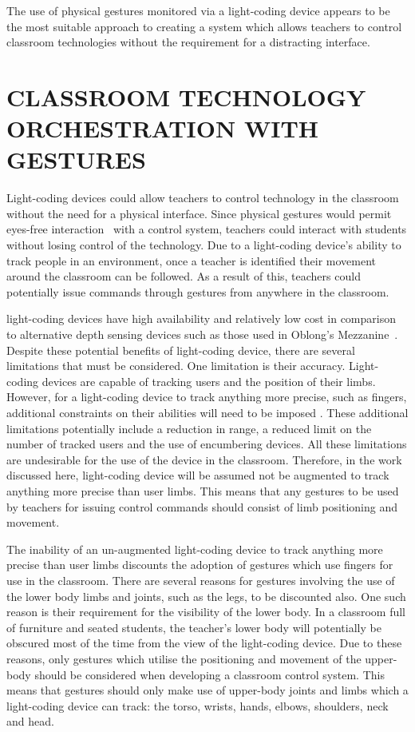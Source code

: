 \documentclass[link]{IWCOMP}
\begin{document}
The use of physical gestures monitored via a light-coding device appears to be the most suitable approach to creating a system which allows teachers to control classroom technologies without the requirement for a distracting interface.

\section{CLASSROOM TECHNOLOGY ORCHESTRATION WITH GESTURES} 
\label{sec:orchestration}

Light-coding devices could allow teachers to control technology in the classroom without the need for a physical interface.
Since physical gestures would permit eyes-free interaction~\cite{Brewster2003} with a control system, teachers could interact with students without losing control of the technology.
Due to a light-coding device's ability to track people in an environment, once a teacher is identified their movement around the classroom can be followed.
As a result of this, teachers could potentially issue commands through gestures from anywhere in the classroom.

light-coding devices have high availability and relatively low cost in comparison to alternative depth sensing devices such as those used in Oblong's Mezzanine~\cite{kramer2011}.
Despite these potential benefits of light-coding device, there are several limitations that must be considered.
One limitation is their accuracy.
Light-coding devices are capable of tracking users and the position of their limbs.
However, for a light-coding device to track anything more precise, such as fingers, additional constraints on their abilities will need to be imposed \cite{Clark2011}.
These additional limitations potentially include a reduction in range, a reduced limit on the number of tracked users and the use of encumbering devices.
All these limitations are undesirable for the use of the device in the classroom.
Therefore, in the work discussed here, light-coding device will be assumed not be augmented to track anything more precise than user limbs.
This means that any gestures to be used by teachers for issuing control commands should consist of limb positioning and movement.

The inability of an un-augmented light-coding device to track anything more precise than user limbs discounts the adoption of gestures which use fingers for use in the classroom.
There are several reasons for gestures involving the use of the lower body limbs and joints, such as the legs, to be discounted also.
One such reason is their requirement for the visibility of the lower body.
In a classroom full of furniture and seated students, the teacher's lower body will potentially be obscured most of the time from the view of the light-coding device.
Due to these reasons, only gestures which utilise the positioning and movement of the upper-body should be considered when developing a classroom control system.
This means that gestures should only make use of upper-body joints and limbs which a light-coding device can track: the torso, wrists, hands, elbows, shoulders, neck and head.
\end{document}
